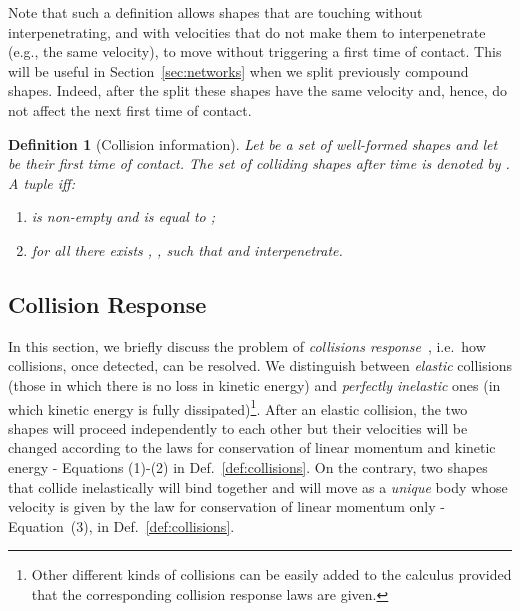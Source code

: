 \documentclass[11pt]{article}
\newtheorem{definition}{Definition}
\begin{document}
Note that such a definition allows shapes that are touching without interpenetrating, and with
velocities that do not make them to interpenetrate (e.g., the same velocity), to move without
triggering a first time of contact. This  will be useful in Section~\ref{sec:networks} when we split previously compound shapes. Indeed, after the split these shapes have the same velocity and, hence, do not affect the next first time of contact.

\begin{definition}[Collision information]\label{def:colls-information}
Let  be a set of well-formed shapes and let  be
their first time of contact. The {\em set of colliding shapes} after time   is denoted by
. A tuple
 iff:

\begin{enumerate}

\item  is \emph{non-empty} and is equal to ;

\item for all  there exists , , such that  and  interpenetrate.
\end{enumerate}
\end{definition}


\subsection{Collision Response} \label{sec:collisionresponse}

In this section, we briefly discuss the problem of {\em collisions response}~\cite{Hecker1997},
i.e.\ how collisions, once detected, can be resolved. We distinguish between {\em elastic} collisions (those in which there is no loss in kinetic energy) and {\em perfectly inelastic} ones (in which kinetic energy is fully dissipated)\footnote{Other different kinds of collisions can be easily added to the calculus provided that the corresponding collision response laws are given.}. After an elastic collision, the two shapes will proceed independently to each other but their velocities will be changed according to the laws for conservation of linear momentum and kinetic energy - Equations (1)-(2) in Def.~\ref{def:collisions}. On the contrary, two shapes that collide inelastically will bind together and will move as a {\em unique} body whose velocity is given by the law for conservation of linear momentum only - Equation~(3), in Def.~\ref{def:collisions}.
\end{document}
